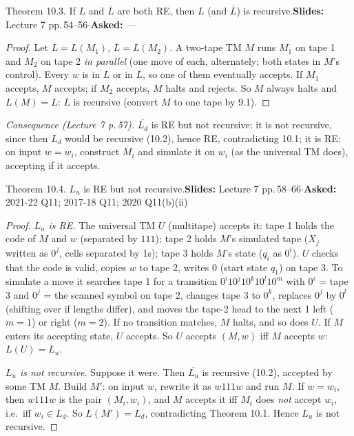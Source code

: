 \documentclass[10.5pt,a4paper]{article}
\newcommand{\src}[2]{{\footnotesize\color{gray!70!black}\textbf{Slides:} #1\enspace$\cdot$\enspace\textbf{Asked:} #2}\par}
\newcommand{\Ld}{L_d}
\newcommand{\Lu}{L_u}
\begin{document}
\begin{thm}{Theorem 10.3. If $L$ and $\overline L$ are both RE, then $L$ (and $\overline L$) is recursive.}\src{Lecture 7 pp.\,54--56}{---}\end{thm}
\begin{proof}
Let $L=L(M_1)$, $\overline L=L(M_2)$. A two-tape TM $M$ runs $M_1$ on tape 1 and $M_2$ on tape 2 \emph{in parallel} (one move of each, alternately;
both states in $M$'s control). Every $w$ is in $L$ or in $\overline L$, so one of them eventually accepts. If $M_1$ accepts, $M$ accepts;
if $M_2$ accepts, $M$ halts and rejects. So $M$ always halts and $L(M)=L$: $L$ is recursive (convert $M$ to one tape by 9.1).
\end{proof}
\emph{Consequence (Lecture 7 p.\,57).} $\overline{\Ld}$ is RE but not recursive: it is not recursive, since then $\Ld$ would be recursive (10.2),
hence RE, contradicting 10.1; it is RE: on input $w=w_i$, construct $M_i$ and simulate it on $w_i$ (as the universal TM does), accepting if it accepts.

\begin{thm}{Theorem 10.4. $\Lu$ is RE but not recursive.}\src{Lecture 7 pp.\,58--66}{2021-22 Q11; 2017-18 Q11; 2020 Q11(b)(ii)}\end{thm}
\begin{proof}
\emph{$\Lu$ is RE.} The universal TM $U$ (multitape) accepts it: tape 1 holds the code of $M$ and $w$ (separated by $111$); tape 2 holds $M$'s
simulated tape ($X_j$ written as $0^j$, cells separated by 1s); tape 3 holds $M$'s state ($q_i$ as $0^i$). $U$ checks that the code is valid,
copies $w$ to tape 2, writes $0$ (start state $q_1$) on tape 3. To simulate a move it searches tape 1 for a transition $0^i10^j10^k10^l10^m$ with
$0^i$ = tape 3 and $0^j$ = the scanned symbol on tape 2, changes tape 3 to $0^k$, replaces $0^j$ by $0^l$ (shifting over if lengths differ),
and moves the tape-2 head to the next 1 left ($m=1$) or right ($m=2$). If no transition matches, $M$ halts, and so does $U$. If $M$ enters its
accepting state, $U$ accepts. So $U$ accepts $(M,w)$ iff $M$ accepts $w$: $L(U)=\Lu$.

\emph{$\Lu$ is not recursive.} Suppose it were. Then $\overline{\Lu}$ is recursive (10.2), accepted by some TM $M$. Build $M'$: on input $w$, rewrite
it as $w111w$ and run $M$. If $w=w_i$, then $w111w$ is the pair $(M_i,w_i)$, and $M$ accepts it iff $M_i$ does \emph{not} accept $w_i$, i.e.\ iff
$w_i\in\Ld$. So $L(M')=\Ld$, contradicting Theorem 10.1. Hence $\Lu$ is not recursive.
\end{proof}
\end{document}
